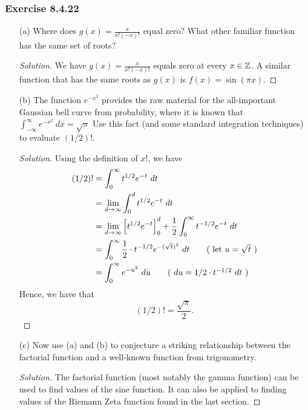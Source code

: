\subsubsection{Exercise 8.4.22}
\begin{enumerate}
    \item[(a)] Where does \( g(x)  = \frac{ x }{ x! (-x)! }  \) equal zero? What other familiar function has the same set of roots? 
        \begin{proof}[Solution]
        We have \( g(x) = \frac{ x }{ x! (-x)! }  \) equals zero at every \(  x \in \mathbb{Z}  \). A similar function that has the same roots as \( g(x)  \) is \( f(x) = \sin(\pi x) \). 
        \end{proof}
    \item[(b)] The function \( e^{-x ^{2}}  \) provides the raw material for the all-important Gaussian bell curve from probability, where it is known that \( \int_{ -\infty  }^{ \infty  }  e^{-x ^{2}} \ dx = \sqrt{ \pi  }   \) Use this fact (and some standard integration techniques) to evaluate \( (1/2)! \).
        \begin{proof}[Solution]
        Using the definition of \( x!  \), we have 
        \begin{align*}
            ( 1/2  )! &= \int_{ 0 }^{ \infty  } t^{1/2} e^{-t } \ dt \\
                                          &= \lim_{ d \to \infty  } \int_{ 0 }^{ d } t^{1/2} e^{-t} \  dt \\
                                          &= \lim_{ d \to \infty  }  \Big[ t^{ 1/2} e^{-t } \Big]_{0}^{d} + \frac{ 1 }{ 2 }  \int_{ 0 }^{ \infty  } t^{-1/2} e^{-t} \ dt \\
                                          &= \int_{ 0 }^{ \infty  } \frac{ 1 }{ 2 }  \cdot t^{-1/2} e^{- (\sqrt{ t } )^{2}} \ dt  \tag{  \text{let \( u = \sqrt{ t }    \)} }  \\
                                          &= \int_{ 0 }^{ \infty  } e^{-u^{2}} \ du \tag{ \( du = 1 /2 \cdot  t^{-1/2} \ dt  \) } \\
        \end{align*}
        Hence, we have that 
        \[  (1/2)! = \frac{ \sqrt{ \pi  }  }{ 2  }. \]
        \end{proof}
    \item[(c)] Now use (a) and (b) to conjecture a striking relationship between the factorial function and a well-known function from trigonometry. 
       \begin{proof}[Solution]
       The factorial function (most notably the gamma function) can be used to find values of the sine function. It can also be applied to finding values of the Riemann Zeta function found in the last section.
       \end{proof} 
\end{enumerate}


